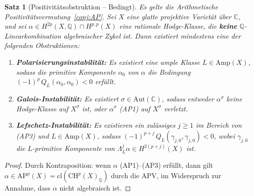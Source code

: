 \documentclass[aps,prd,twocolumn,superscriptaddress,nofootinbib]{revtex4-2}
\newtheorem{theorem}{Satz}[section]
\theoremstyle{definition}
\theoremstyle{remark}
\begin{document}
\begin{theorem}[Positivitätsobstruktion -- Bedingt]
\label{thm:nogo}
Es gelte die Arithmetische Positivitätsvermutung~\ref{conj:AP}. Sei $X$ eine glatte projektive Varietät über $\mathbb{C}$, und sei $\alpha \in H^{2p}(X, \mathbb{Q}) \cap H^{p,p}(X)$ eine rationale Hodge-Klasse, die \textbf{keine} $\mathbb{Q}$-Linearkombination algebraischer Zykel ist. Dann existiert mindestens eine der folgenden Obstruktionen:

\begin{enumerate}
\item[\textbf{(O1)}] \textbf{Polarisierungsinstabilität:} Es existiert eine ample Klasse $L \in \mathrm{Amp}(X)$, sodass die primitive Komponente $\alpha_0$ von $\alpha$ die Bedingung $(-1)^p\,Q_L(\alpha_0, \alpha_0) < 0$ erfüllt.

\item[\textbf{(O2)}] \textbf{Galois-Instabilität:} Es existiert $\sigma \in \mathrm{Aut}(\mathbb{C})$, sodass entweder $\alpha^\sigma$ keine Hodge-Klasse auf $X^\sigma$ ist, oder $\alpha^\sigma$ (AP1) auf $X^\sigma$ verletzt.

\item[\textbf{(O3)}] \textbf{Lefschetz-Instabilität:} Es existieren ein zulässiges $j \geq 1$ im Bereich von (AP3) und $L \in \mathrm{Amp}(X)$, sodass $(-1)^{p+j}\,Q_L(\gamma_{j,0}, \gamma_{j,0}) < 0$, wobei $\gamma_{j,0}$ die $L$-primitive Komponente von $\Lambda_L^j \alpha \in H^{2(p+j)}(X)$ ist.
\end{enumerate}
\end{theorem}

\begin{proof}
Durch Kontraposition: wenn $\alpha$ (AP1)--(AP3) erfüllt, dann gilt $\alpha \in \mathrm{AP}^p(X) = \mathrm{cl}(\mathrm{CH}^p(X)_\mathbb{Q})$ durch die APV, im Widerspruch zur Annahme, dass $\alpha$ nicht algebraisch ist.
\end{proof}
\end{document}
